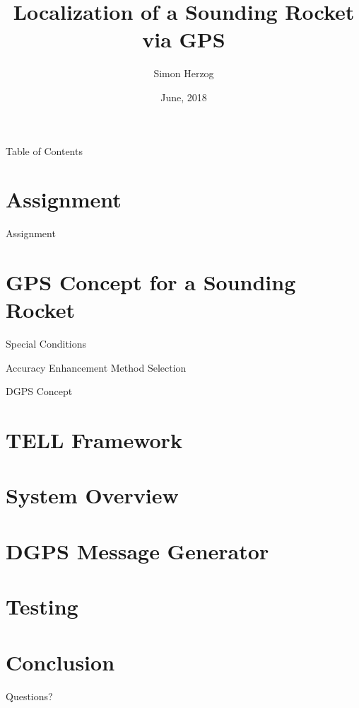 \documentclass[12pt, compress, xcolor=table]{beamer}
\title{Localization of a Sounding Rocket via GPS}
\author{Simon Herzog}
\institute{Final Presentation Bachelor Thesis}
\date{June, 2018}
\begin{document}
\maketitle

\begin{frame}{Table of Contents}
 \tableofcontents
\end{frame}


\section{Assignment}

\begin{frame}{Assignment}
 
\end{frame}


\section{GPS Concept for a Sounding Rocket}

\begin{frame}{Special Conditions}
 
\end{frame}

\begin{frame}{Accuracy Enhancement Method Selection}
 
\end{frame}

\begin{frame}{DGPS Concept}
 
\end{frame}


\section{TELL Framework}

\section{System Overview}

\section{DGPS Message Generator}

\section{Testing}

\section{Conclusion}

\begin{frame}[standout]
 Questions?
\end{frame}
\end{document}
